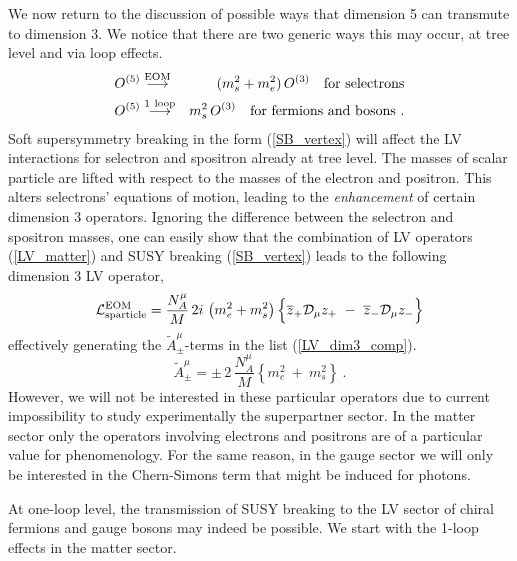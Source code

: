 \documentclass[12pt]{revtex4}
\begin{document}
We now return to the discussion of possible ways that dimension 5 
can transmute to dimension 3. We notice that there are two generic ways this 
may occur, at tree level and via loop effects.
\begin{eqnarray*}
\nonumber
O^{(5)} & \stackrel{\mathrm {EOM}}{\longrightarrow} &
  (m_{s}^2 + m_e^2)\, O^{(3)}~~~{\rm for~selectrons}\\
\nonumber
O^{(5)} & \stackrel{\mathrm {1\ loop}}{\longrightarrow} &
  m_{s}^2\, O^{(3)} ~~~{\rm for~fermions ~and ~bosons}
~.
\end{eqnarray*}
Soft supersymmetry
breaking in the form (\ref{SB_vertex}) will affect the
LV interactions for selectron and spositron already at tree level.
The  masses of scalar particle are lifted with
respect to the masses of the electron and positron. 
This alters selectrons' equations of motion, leading to the 
{\em enhancement} of certain dimension 3 operators. Ignoring 
the difference between the selectron and spositron
masses, one can easily show that the combination of LV operators (\ref{LV_matter}) and 
SUSY breaking (\ref{SB_vertex}) leads to the following dimension 3 LV operator,
\begin{equation}
  \mathcal{L}_{\rm sparticle}^{\rm EOM} = 
\frac{N_A^\mu}{M}\, 2 i\, 
\left(
m_e^2 + m_s^2
\right)
\Bigl\{ 
\overline{z}_+ \mathcal{D}_\mu z_+ 
~-~
\overline{z}_- \mathcal{D}_\mu z_- 
\Bigr\}
\end{equation}
effectively  generating the $ \widetilde{A}^\mu_\pm $-terms in 
the list (\ref{LV_dim3_comp}). \begin{equation}
\widetilde{A}_\pm^\mu = 
\pm\, 2\, \frac{N_A^\mu}
                        { M }   
\left\{
m_e^2 ~+~ m_s^2
\right\}~.
\end{equation}
However, we will not be interested in these particular operators 
due to current impossibility to study experimentally  the superpartner sector. 
In the matter sector only the operators involving electrons and positrons are 
     of a particular value for phenomenology.  
For the same reason, in the gauge sector we will only be interested
in the Chern-Simons term that might be induced for photons.

At one-loop level, the transmission 
of SUSY breaking to the LV sector of chiral fermions and gauge bosons may indeed
be possible. We start with the 1-loop effects in the matter sector.
\end{document}
